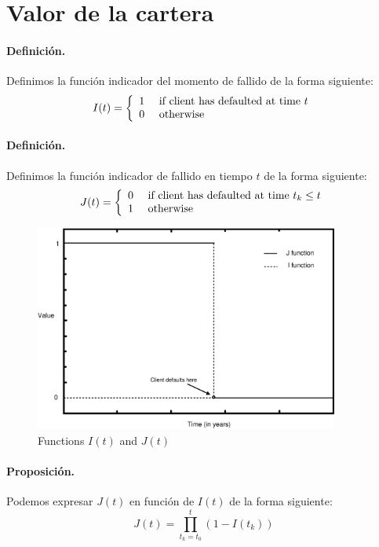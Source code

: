 \section{Valor de la cartera}

\paragraph{Definici\'on.} Definimos la funci\'on indicador del momento de 
fallido de la forma siguiente:
\begin{displaymath}
I(t) = \left\{
\begin{array}{ll}
1 & \textrm{ if client has defaulted at time } t \cr
0 & \textrm{ otherwise}
\end{array}
\right.
\end{displaymath}

\paragraph{Definici\'on.} Definimos la funci\'on indicador de fallido en 
tiempo $t$ de la forma siguiente:
\begin{displaymath}
J(t) = \left\{
\begin{array}{ll}
0 & \textrm{ if client has defaulted at time } t_k \leq t\cr
1 & \textrm{ otherwise}
\end{array}
\right.
\end{displaymath}

\begin{figure}[!hb]
\begin{center}
\includegraphics[width=10cm,angle=0]{./images/functionsIJ.eps}
\caption{Functions $I(t)$ and $J(t)$}
\label{functionsIJ}
\end{center}
\end{figure}

\paragraph{Proposici\'on.} Podemos expresar $J(t)$ en funci\'on de $I(t)$ de la
forma siguiente:
\begin{displaymath}
J(t) = \prod_{t_k=t_0}^{t} (1-I(t_k))
\end{displaymath}

